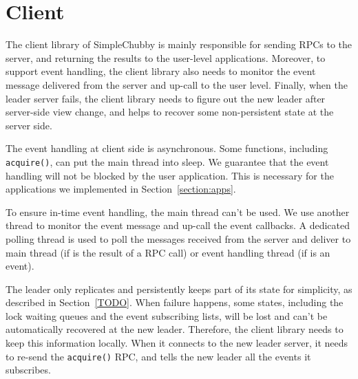 \section{Client}
\label{section:client}

The client library of SimpleChubby is mainly responsible for sending RPCs to the
server, and returning the results to the user-level applications. Moreover, to
support event handling, the client library also needs to monitor the event
message delivered from the server and up-call to the user level. Finally, when
the leader server fails, the client library needs to figure out the new leader
after server-side view change, and helps to recover some non-persistent state
at the server side.

The event handling at client side is asynchronous. Some functions, including
\texttt{acquire()}, can put the main thread into sleep. We guarantee that the
event handling will not be blocked by the user application. This is necessary
for the applications we implemented in Section~\ref{section:apps}.

To ensure in-time event handling, the main thread can't be used. We use
another thread to monitor the event message and up-call the event callbacks.
A dedicated polling thread is used to poll the messages received from the server
and deliver to main thread (if is the result of a RPC call) or event handling
thread (if is an event).


The leader only replicates and persistently keeps part of its state for
simplicity, as described in Section~\ref{TODO}. When failure happens, some
states, including the lock waiting queues and the event subscribing lists,
will be lost and can't be automatically recovered at the new leader. Therefore,
the client library needs to keep this information locally. When it connects
to the new leader server, it needs to re-send the \texttt{acquire()} RPC,
and tells the new leader all the events it subscribes.


